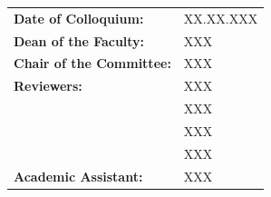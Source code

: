 \begin{titlepage}
\newpage
\thispagestyle{empty}
\vspace*{\fill}
\begin{center}\normalsize
	\begin{tabular}{l@{\hskip 1cm}l}
	\bfseries Date of Colloquium: & XX.XX.XXX\\
	\bfseries Dean of the Faculty: & XXX\\
	\bfseries Chair of the Committee: & XXX\\
	\bfseries Reviewers: & XXX\\
	& XXX\\
	& XXX\\
	& XXX\\
	\bfseries Academic Assistant: & XXX\\
	\end{tabular}
\end{center}
\end{titlepage}



